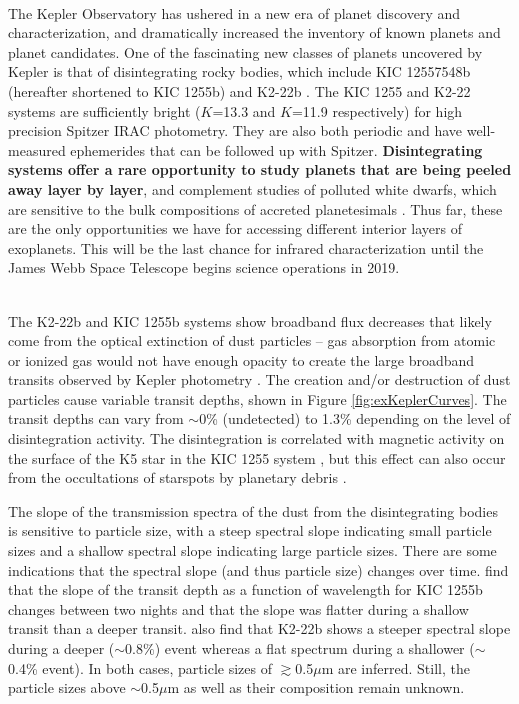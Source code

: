 \documentclass[letterpaper,12pt]{article}
\begin{document}
\\
The Kepler Observatory has ushered in a new era of planet discovery and characterization, and dramatically increased the inventory of known planets and planet candidates.
One of the fascinating new classes of planets uncovered by Kepler is that of disintegrating rocky bodies,
which include KIC 12557548b (hereafter shortened to KIC 1255b) \citep{rappaport} and K2-22b \citep{sanchis-ojedak2-22}.
The KIC 1255 and K2-22 systems are sufficiently bright ($K$=13.3 and $K$=11.9 respectively) for high precision Spitzer IRAC photometry.
They are also both periodic and have well-measured ephemerides that can be followed up with Spitzer.
\textbf{Disintegrating systems offer a rare opportunity to study planets that are being peeled away layer by layer}, and complement studies of polluted white dwarfs, which are sensitive to the bulk compositions of accreted planetesimals \cite[e.g.][]{jura2003wdPollution}.
Thus far, these are the only opportunities we have for accessing different interior layers of exoplanets.
This will be the last chance for infrared characterization until the James Webb Space Telescope begins science operations in 2019.\newline

\\
The K2-22b and KIC 1255b systems show broadband flux decreases that likely come from the optical extinction of dust particles -- gas absorption from atomic or ionized gas would not have enough opacity to create the large broadband transits observed by Kepler photometry \citep[0.42 $\mu$m to 0.90 $\mu$m bandpass;][]{koch2010keplerChar}.
The creation and/or destruction of dust particles cause variable transit depths, shown in Figure \ref{fig:exKeplerCurves}.
The transit depths can vary from $\sim$0\% (undetected) to 1.3\% depending on the level of disintegration activity.
The disintegration is correlated with magnetic activity on the surface of the K5 star in the KIC 1255 system \citep{kawahara2013starspots}, but this effect can also occur from the occultations of starspots by planetary debris \citep{croll2015starspots}.

The slope of the transmission spectra of the dust from the disintegrating bodies is sensitive to particle size, with a steep spectral slope indicating small particle sizes and a shallow spectral slope indicating large particle sizes.
There are some indications that the spectral slope (and thus particle size) changes over time.
\citet{bochinski2015evolving} find that the slope of the transit depth as a function of wavelength for KIC 1255b changes between two nights and that the slope was flatter during a shallow transit than a deeper transit. 
\cite{sanchis-ojedak2-22} also find that K2-22b shows a steeper spectral slope during a deeper ($\sim 0.8\%$) event whereas a flat spectrum during a shallower ($\sim$ 0.4\% event).
In both cases, particle sizes of $\gtrsim$0.5$\mu$m are inferred.
Still, the particle sizes above $\sim$0.5$\mu$m as well as their composition remain unknown.
\end{document}
